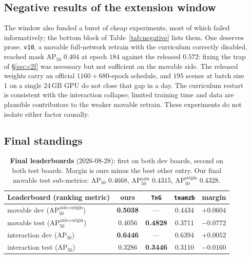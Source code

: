 \documentclass[11pt]{article}
\newcommand{\metric}{AP$_{50}^{\text{axis+origin}}$}
\newcommand{\apfifty}{AP$_{50}$}
\begin{document}
\subsection{Negative results of the extension window}

The window also funded a burst of cheap experiments, most of which failed
informatively; the bottom block of Table~\ref{tab:negative} lists them. One
deserves prose. \texttt{v10}, a movable full-network retrain with the
curriculum correctly disabled, reached mask \apfifty{} $0.404$ at epoch
$184$ against the released $0.572$: fixing the trap of \S\ref{sec:c2f} was
necessary but not sufficient on the movable side. The released weights
carry an official $1160{+}680$-epoch schedule, and $195$ scenes at batch
size $1$ on a single 24\,GB GPU do not close that gap in a day. The
curriculum restart is consistent with the interaction collapse; limited
training time and data are plausible contributors to the weaker movable
retrain. These experiments do not isolate either factor causally.

\subsection{Final standings}

\begin{table}[t]
\centering
\small
\begin{tabular}{lcccc}
\toprule
Leaderboard (ranking metric) & ours & \texttt{TnG} & \texttt{teamzb} & margin \\
\midrule
movable dev (\metric{})       & \textbf{0.5038} & --- & 0.4434 & $+0.0604$ \\
movable test (\metric{})      & 0.4056 & \textbf{0.4828} & 0.3711 & $-0.0772$ \\
interaction dev (\apfifty{})  & \textbf{0.6446} & --- & 0.6394 & $+0.0052$ \\
interaction test (\apfifty{}) & 0.3286 & \textbf{0.3446} & 0.3110 & $-0.0160$ \\
\bottomrule
\end{tabular}
\caption{\textbf{Final leaderboards} (2026-08-28): first on both dev boards, second on both
test boards. Margin is ours minus the best other entry. Our final movable
test sub-metrics: \apfifty{} $0.4668$, AP$_{50}^{\text{axis}}$ $0.4315$,
AP$_{50}^{\text{origin}}$ $0.4328$.}
\label{tab:final}
\end{table}
\end{document}
